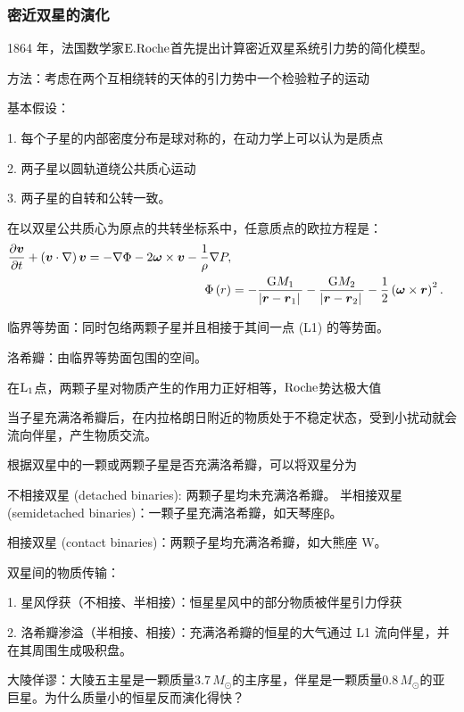 \documentclass[../天体物理基础.tex]{subfiles}
\begin{document}
\subsubsection{密近双星的演化}
1864 年，法国数学家$\rm E. Roche$首先提出计算密近双星系统引力势的简化模型。

方法：考虑在两个互相绕转的天体的引力势中一个检验粒子的运动

基本假设：

1. 每个子星的内部密度分布是球对称的，在动力学上可以认为是质点

2. 两子星以圆轨道绕公共质心运动

3. 两子星的自转和公转一致。

在以双星公共质心为原点的共转坐标系中，任意质点的欧拉方程是：
\begin{align}
\frac{\partial{}\boldsymbol{v}}{\partial{}t}+\left(\boldsymbol{v}\cdot\nabla\right)\boldsymbol{v}=-\nabla\Phi-2\boldsymbol{\omega}\times\boldsymbol{v}-\frac{1}{\rho}\nabla P,\notag\\
\Phi\left(r\right)&=-\frac{\mathrm{G}M_{1}}{\left\vert{}\boldsymbol{r}-\boldsymbol{r}_{1}\right\vert{}}-\frac{\mathrm{G}M_{2}}{\left\vert{}\boldsymbol{r}-\boldsymbol{r}_{2}\right\vert{}}-\frac{1}{2}\left(\boldsymbol{\omega}\times\boldsymbol{r}\right)^{2}.
\end{align}

临界等势面：同时包络两颗子星并且相接于其间一点 (L1) 的等势面。


洛希瓣：由临界等势面包围的空间。

在$\rm L_1$点，两颗子星对物质产生的作用力正好相等，$\rm Roche$势达极大值

当子星充满洛希瓣后，在内拉格朗日附近的物质处于不稳定状态，受到小扰动就会流向伴星，产生物质交流。


根据双星中的一颗或两颗子星是否充满洛希瓣，可以将双星分为

不相接双星 (detached binaries): 两颗子星均未充满洛希瓣。
半相接双星 (semidetached binaries)：一颗子星充满洛希瓣，如天琴座β。

相接双星 (contact binaries)：两颗子星均充满洛希瓣，如大熊座 W。

双星间的物质传输：

1. 星风俘获（不相接、半相接）：恒星星风中的部分物质被伴星引力俘获

2. 洛希瓣渗溢（半相接、相接）：充满洛希瓣的恒星的大气通过 L1 流向伴星，并在其周围生成吸积盘。

大陵佯谬：大陵五主星是一颗质量$3.7\,M_{\odot}$的主序星，伴星是一颗质量$0.8\,M_{\odot}$的亚巨星。为什么质量小的恒星反而演化得快？
\end{document}
